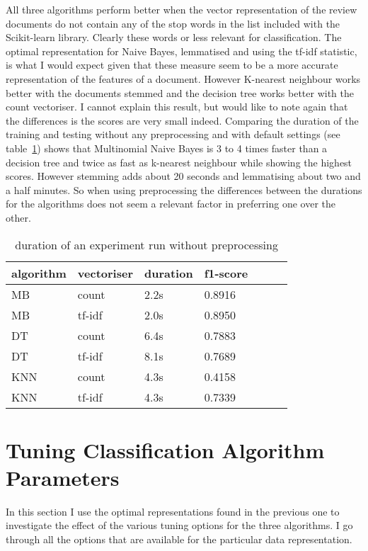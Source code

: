\documentclass[11pt]{article}
\begin{document}
All three algorithms perform better when the vector representation of the review documents do not contain any of the stop words in the list included with the Scikit-learn library. Clearly these words or less relevant for classification. The optimal representation for Naive Bayes, lemmatised and using the tf-idf statistic, is what I would expect given that these measure seem to be a more accurate representation of the features of a document. However K-nearest neighbour works better with the documents stemmed and the decision tree works better with the count vectoriser. I cannot explain this result, but would like to note again that the differences is the scores are very small indeed. Comparing the duration of the training and testing without any preprocessing and with default settings (see table~\ref{tab:repres-duration}) shows that Multinomial Naive Bayes is 3 to 4 times faster than a decision tree and twice as fast as k-nearest neighbour while showing the highest scores. However stemming adds about 20 seconds and lemmatising about two and a half minutes. So when using preprocessing the differences between the durations for the algorithms does not seem a relevant factor in preferring one over the other.

\begin{table}[ht]\footnotesize
\centering
\begin{tabular}{ l l l l l l l }
algorithm & vectoriser & duration & f1-score \\
\hline
MB & count &  2.2s & 0.8916 \\
MB & tf-idf & 2.0s & 0.8950 \\
DT & count &  6.4s & 0.7883 \\
DT & tf-idf & 8.1s & 0.7689 \\
KNN & count & 4.3s & 0.4158 \\
KNN & tf-idf & 4.3s & 0.7339 \\
\end{tabular}
\caption{duration of an experiment run without preprocessing}
\label{tab:repres-duration}
\end{table}

\section{Tuning Classification Algorithm Parameters}

In this section I use the optimal representations found in the previous one to investigate the effect of the various tuning options for the three algorithms. I go through all the options that are available for the particular data representation.
\end{document}
